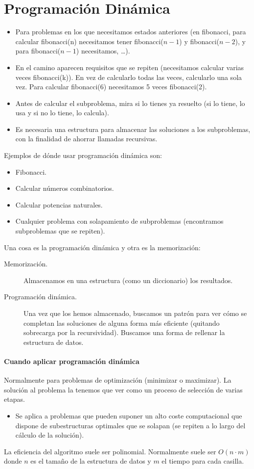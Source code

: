 \chapter{Programación Dinámica}
\begin{itemize}
    \item Para problemas en los que necesitamos estados anteriores (en fibonacci, para calcular fibonacci(n) necesitamos tener fibonacci($n-1$) y fibonacci($n-2$), y para fibonacci($n-1$) necesitamos, \ldots).
    \item En el camino aparecen requisitos que se repiten (necesitamos calcular varias veces fibonacci(k)). En vez de calcularlo todas las veces, calcularlo una sola vez. Para calcular fibonacci(6) necesitamos 5 veces fibonacci(2).
    \item Antes de calcular el subproblema, mira si lo tienes ya resuelto (si lo tiene, lo usa y si no lo tiene, lo calcula).
    \item Es necesaria una estructura para almacenar las soluciones a los subproblemas, con la finalidad de ahorrar llamadas recursivas.
\end{itemize}
Ejemplos de dónde usar programación dinámica son:
\begin{itemize}
    \item Fibonacci.
    \item Calcular números combinatorios.
    \item Calcular potencias naturales.
    \item Cualquier problema con solapamiento de subproblemas (encontramos subproblemas que se repiten).
\end{itemize}
Una cosa es la programación dinámica y otra es la memorización:
\begin{description}
    \item [Memorización.] Almacenamos en una estructura (como un diccionario) los resultados.
    \item [Programación dinámica.] Una vez que los hemos almacenado, buscamos un patrón para ver cómo se completan las soluciones de alguna forma más eficiente (quitando sobrecarga por la recursividad). Buscamos una forma de rellenar la estructura de datos.
\end{description}

\subsubsection{Cuando aplicar programación dinámica}
Normalmente para problemas de optimización (minimizar o maximizar). La solución al problema la tenemos que ver como un proceso de selección de varias etapas.
\begin{itemize}
    \item Se aplica a problemas que pueden suponer un alto coste computacional que dispone de subestructuras optimales que se solapan (se repiten a lo largo del cálculo de la solución).
\end{itemize}
La eficiencia del algoritmo suele ser polinomial. Normalmente suele ser $O(n\cdot m)$ donde $n$ es el tamaño de la estructura de datos y $m$ el tiempo para cada casilla.

